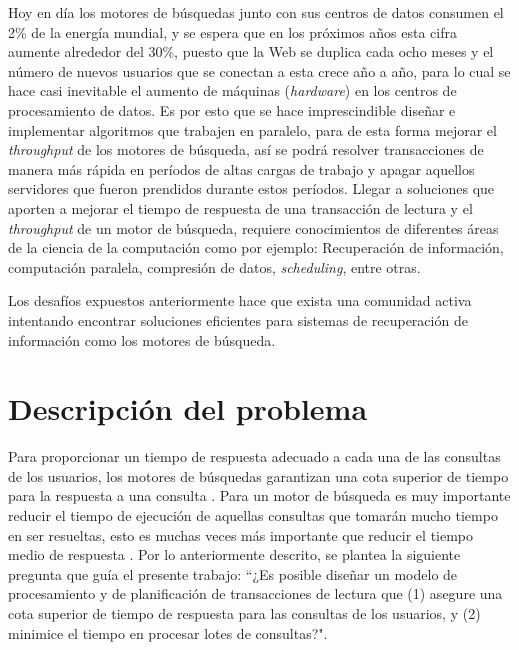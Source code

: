 Hoy en día los motores de búsquedas junto con sus centros de datos consumen el 2\% de la energía mundial, y se espera que en los próximos años esta cifra aumente alrededor del 30\%, puesto que la Web se duplica cada ocho meses y el número de nuevos usuarios que se conectan a esta crece año a año, para lo cual se hace casi inevitable el aumento de máquinas (\textit{hardware}) en los centros de procesamiento de datos. Es por esto que se hace imprescindible diseñar e implementar algoritmos que trabajen en paralelo, para de esta forma mejorar el \textit{throughput} de los motores de búsqueda, así se podrá resolver transacciones de manera más rápida en períodos de altas cargas de trabajo y apagar aquellos servidores que fueron prendidos durante estos períodos. Llegar a soluciones que aporten a mejorar el tiempo de respuesta de una transacción de lectura y el \textit{throughput} de un motor de búsqueda, requiere conocimientos de diferentes áreas de la ciencia de la computación como por ejemplo: Recuperación de información, computación paralela, compresión de datos, \textit{scheduling}, entre otras. 

Los desafíos expuestos anteriormente hace que exista una comunidad activa intentando encontrar soluciones eficientes para sistemas de recuperación de información como los motores de búsqueda.  

\section{Descripci\'on del problema}
\label{intro:problema}
Para proporcionar un tiempo de respuesta adecuado a cada una de las consultas de los usuarios, los motores de búsquedas garantizan una cota superior de tiempo para la respuesta a una consulta \citep{Jeon:2014}. Para un motor de búsqueda es muy importante reducir el tiempo de ejecución de aquellas consultas que tomarán mucho tiempo en ser resueltas, esto es muchas veces más importante que reducir el tiempo medio de respuesta \citep{Dean:2013}. Por lo anteriormente descrito, se plantea la siguiente pregunta que guía el presente trabajo: ``¿Es posible diseñar un modelo de procesamiento y de planificación de transacciones de lectura que (1) asegure una cota superior de tiempo de respuesta para las consultas de los usuarios, y (2) minimice el tiempo en procesar lotes de consultas?".  

